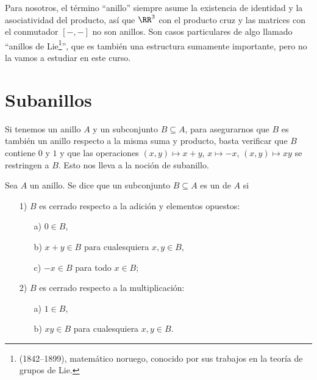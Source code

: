Para nosotros, el término ``anillo'' siempre asume la existencia de identidad y
la asociatividad del producto, así que $\RR^3$ con el producto cruz y las
matrices con el conmutador $[-,-]$ no son anillos. Son casos particulares de
algo llamado ``anillos de Lie\footnote{ (1842--1899),
  matemático noruego, conocido por sus trabajos en la teoría de grupos de
  Lie.}'', que es también una estructura sumamente importante, pero no la vamos
a estudiar en este curso.


\section{Subanillos}

Si tenemos un anillo $A$ y un subconjunto $B \subseteq A$, para asegurarnos que
$B$ es también un anillo respecto a la misma suma y producto, basta verificar
que $B$ contiene $0$ y $1$ y que las operaciones $(x,y)\mapsto x+y$,
$x\mapsto -x$, $(x,y) \mapsto xy$ se restringen a $B$. Esto nos lleva a
la noción de subanillo.

\begin{definicion}
  Sea $A$ un anillo. Se dice que un subconjunto $B \subseteq A$ es un
   de $A$ si

  \begin{enumerate}
  \item[1)] $B$ es cerrado respecto a la adición y elementos opuestos:

    \begin{itemize}
    \item[a)] $0 \in B$,
    \item[b)] $x+y \in B$ para cualesquiera $x,y\in B$,
    \item[c)] $-x \in B$ para todo $x\in B$;
    \end{itemize}

  \item[2)] $B$ es cerrado respecto a la multiplicación:

    \begin{itemize}
    \item[a)] $1 \in B$,
    \item[b)] $xy\in B$ para cualesquiera $x,y\in B$.
    \end{itemize}
  \end{enumerate}
\end{definicion}

